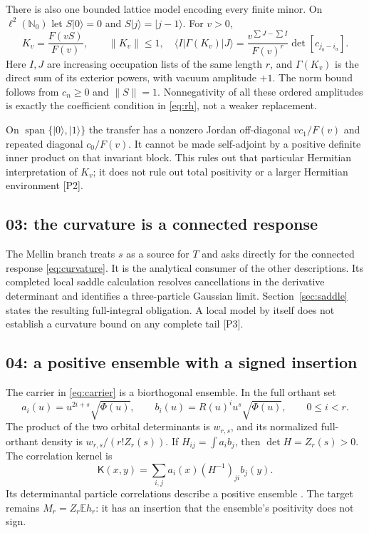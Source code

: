 \documentclass[11pt,letterpaper]{article}
\numberwithin{equation}{section}
\theoremstyle{remark}
\newcommand{\E}{\mathbb E}
\newcommand{\N}{\mathbb N}
\newcommand{\evid}[1]{\textsf{[#1]}}
\newcommand{\ket}[1]{\lvert #1\rangle}
\newcommand{\bra}[1]{\langle #1\rvert}
\begin{document}
There is also one bounded lattice model encoding every finite minor.
On $\ell^2(\N_0)$ let $S\ket0=0$ and $S\ket j=\ket{j-1}$. For $v>0$,
\begin{equation}
 K_v=\frac{F(vS)}{F(v)},\qquad \|K_v\|\le1,
 \quad
 \bra I\Gamma(K_v)\ket J=
 \frac{v^{\sum J-\sum I}}{F(v)^r}\det[c_{j_b-i_a}].
 \label{eq:transfer}
\end{equation}
Here $I,J$ are increasing occupation lists of the same length $r$,
and $\Gamma(K_v)$ is the direct sum of its exterior powers, with
vacuum amplitude $+1$. The norm bound follows from $c_n\ge0$ and
$\|S\|=1$. Nonnegativity of all these ordered amplitudes is exactly
the coefficient condition in \eqref{eq:rh}, not a weaker replacement.

On $\operatorname{span}\{\ket0,\ket1\}$ the transfer has a nonzero
Jordan off-diagonal $vc_1/F(v)$ and repeated diagonal $c_0/F(v)$.
It cannot be made self-adjoint by a positive definite inner product on
that invariant block. This rules out that particular Hermitian
interpretation of $K_v$; it does not rule out total positivity or a
larger Hermitian environment \evid{P2}.

\subsection{03: the curvature is a connected response}

The Mellin branch treats $s$ as a source for $T$ and asks directly for
the connected response \eqref{eq:curvature}. It is the analytical
consumer of the other descriptions. Its completed local saddle
calculation resolves cancellations in the derivative determinant and
identifies a three-particle Gaussian limit. Section~\ref{sec:saddle}
states the resulting full-integral obligation. A local model by itself
does not establish a curvature bound on any complete tail \evid{P3}.

\subsection{04: a positive ensemble with a signed insertion}

The carrier in \eqref{eq:carrier} is a biorthogonal ensemble. In the
full orthant set
\[
 a_i(u)=u^{2i+s}\sqrt{\Phi(u)},\qquad
 b_i(u)=R(u)^i u^s\sqrt{\Phi(u)},\qquad 0\le i<r.
\]
The product of the two orbital determinants is $w_{r,s}$, and its
normalized full-orthant density is $w_{r,s}/(r!Z_r(s))$.
If $H_{ij}=\int a_i b_j$, then $\det H=Z_r(s)>0$.
The correlation kernel is
\[
 \mathsf K(x,y)=\sum_{i,j}a_i(x)(H^{-1})_{ji}b_j(y).
\]
Its determinantal particle correlations describe a positive ensemble
\cite{Borodin1998,DesrosiersForrester2006}. The target remains
$M_r=Z_r\E h_r$: it has an insertion that the ensemble's positivity
does not sign.
\end{document}
